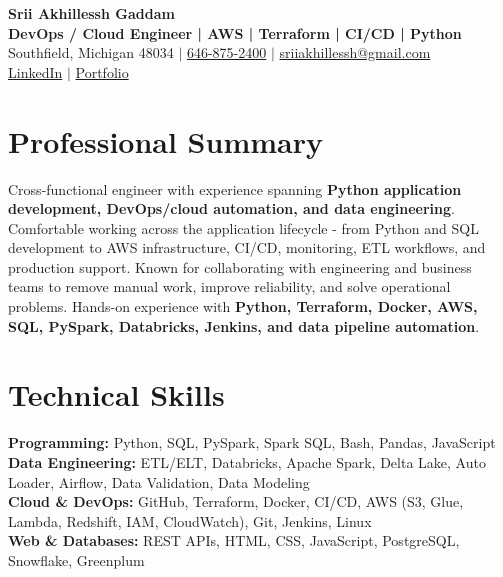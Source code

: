 \documentclass[letterpaper,10pt]{article}
\begin{document}
\fontsize{9.35pt}{10.45pt}\selectfont

\begin{center}
    {\LARGE \textbf{Srii Akhillessh Gaddam}} \\[-1pt]
    \textbf{DevOps / Cloud Engineer | AWS | Terraform | CI/CD | Python} \\[2pt]
    Southfield, Michigan 48034 $|$
    \href{tel:6468752400}{646-875-2400} $|$
    \href{mailto:sriiakhillessh@gmail.com}{sriiakhillessh@gmail.com} \\[1pt]
    \href{https://www.linkedin.com/in/srii-akhiilessh-gaddam-b48668191/}{LinkedIn} $|$
    \href{https://sriiakhillesshg.github.io/portfolio/}{Portfolio}
\end{center}
\vspace{-8pt}

\section{Professional Summary}
\small{Cross-functional engineer with experience spanning \textbf{Python application development, DevOps/cloud automation, and data engineering}. Comfortable working across the application lifecycle - from Python and SQL development to AWS infrastructure, CI/CD, monitoring, ETL workflows, and production support. Known for collaborating with engineering and business teams to remove manual work, improve reliability, and solve operational problems. Hands-on experience with \textbf{Python, Terraform, Docker, AWS, SQL, PySpark, Databricks, Jenkins, and data pipeline automation}.}

\section{Technical Skills}
\small{
\textbf{Programming:} Python, SQL, PySpark, Spark SQL, Bash, Pandas, JavaScript \\
\textbf{Data Engineering:} ETL/ELT, Databricks, Apache Spark, Delta Lake, Auto Loader, Airflow, Data Validation, Data Modeling \\
\textbf{Cloud \& DevOps:} GitHub, Terraform, Docker, CI/CD, AWS (S3, Glue, Lambda, Redshift, IAM, CloudWatch), Git, Jenkins, Linux \\
\textbf{Web \& Databases:} REST APIs, HTML, CSS, JavaScript, PostgreSQL, Snowflake, Greenplum
}
\end{document}
